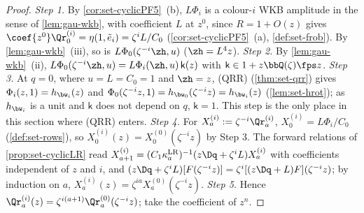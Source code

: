 \begin{proof}
\emph{Step 1.} By \cref{cor:set-cyclicPF5}~(b), $L\Phi_i$ is a colour-$i$ WKB amplitude in the sense of \cref{lem:gau-wkb}, with coefficient $L$ at $z^0$, since $R=1+O(z)$ gives $\coef{z^0}\Qr^{(i)}_0=\eta(1,\tilde e_i)=\zeta^iL/C_0$ (\cref{cor:set-cyclicPF5}~(a), \cref{def:set-frob}). By \cref{lem:gau-wkb}~(iii), so is $L\Phi_0(\zeta^{-i}\zh,u)$ ($\zh=L^4z$). \emph{Step 2.} By \cref{lem:gau-wkb}~(ii), $L\Phi_0(\zeta^{-i}\zh,u)=L\Phi_i(\zh,u)\,\mathsf k(z)$ with $\mathsf k\in1+z\bbQ(\zeta)\fps z$. \emph{Step 3.} At $q=0$, where $u=L=C_0=1$ and $\zh=z$, (QRR) (\cref{thm:set-qrr}) gives $\Phi_i(z,1)=h_{\bw_i}(z)$ and $\Phi_0(\zeta^{-i}z,1)=h_{\bw_0}(\zeta^{-i}z)=h_{\bw_i}(z)$ (\cref{lem:set-hrot}); as $h_{\bw_i}$ is a unit and $\mathsf k$ does not depend on $q$, $\mathsf k=1$. This step is the only place in this section where (QRR) enters. \emph{Step 4.} For $X^{(i)}_a:=\zeta^{-i}\Qr^{(i)}_a$, $X^{(i)}_0=L\Phi_i/C_0$ (\cref{def:set-rows}), so $X^{(i)}_0(z)=X^{(0)}_0(\zeta^{-i}z)$ by Step 3. The forward relations of \cref{prop:set-cyclicLR} read $X^{(i)}_{a+1}=(C_1\kappa^{\mathrm{LR}}_a)^{-1}(z\Dq+\zeta^iL)X^{(i)}_a$ with coefficients independent of $z$ and $i$, and $(z\Dq+\zeta^iL)[F(\zeta^{-i}z)]=\zeta^i[(z\Dq+L)F](\zeta^{-i}z)$; by induction on $a$, $X^{(i)}_a(z)=\zeta^{ia}X^{(0)}_a(\zeta^{-i}z)$. \emph{Step 5.} Hence $\Qr^{(i)}_a(z)=\zeta^{i(a+1)}\Qr^{(0)}_a(\zeta^{-i}z)$; take the coefficient of $z^n$.
\end{proof}


